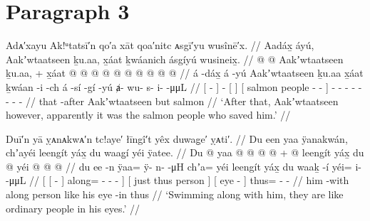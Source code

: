 \clearpage
\section{Paragraph 3}\label{sec:100-para-3}

\ex\label{ex:100-39-salmon-people-rescue}%
%
\begingl
	\glpreamble	Adᴀ′xayu Ak!ᵘtatsī′n qo′a xāt qoa′nitc ᴀsgī′yu wusînē′x. //
	\glpreamble	Aadáx̱ áyú, Aakʼwtaatseen ḵu.aa, x̱áat ḵwáanich ásgíyú wusineix̱. //
	\gla	{}  @ {} {}  @ {} 
		{} Aakʼwtaatseen {} ḵu.aa, +
		{} x̱áat  @ {} @ {} {}  @ {} @ {} @ {}
		 @ {} @ {} @ {} @ {} @ {} //
	\glb	{} á -dáx̱ {} á -yú
		{} Aakʼwtaatseen {} ḵu.aa
		{} x̱áat ḵwáan -i -ch {} á -sí -gí -yú
		ⱥ- wu- s- i-  -μμL //
	\glc	{}[  - {}]  -
		{}[  {}] 
		{}[ salmon people - - {}]  - - -
		- - - -  - //
	\gld	{} that -after {}  {}
		{} Aakʼwtaatseen {} but
		{} salmon  {} {} {}  {} {} {}
		 {} {} {} {} {} //
	\glft	‘After that, Aakʼwtaatseen however, apparently it was the salmon people who saved him.’
		//
\endgl
\xe

\ex\label{ex:100-40-salmon-people-rescue}%
%
\begingl
	\glpreamble	Duī′n yā ỵᴀnᴀkwᴀ′n tc!aye′ łīngî′t yêx duwag̣e′ ỵᴀti′. //
	\glpreamble	Du een yaa ÿanakwán, chʼayéi leengít yáx̱ du waag̱í yéi ÿatee. //
	\gla	{} {} Du  @ {} {} 
			yaa @  @ {} @ {} @ {} {} +
		{}  @ {} leengít yáx̱ {}
		{} du  @ {} {}
		yéi @  @ {} @ {} //
	\glb	{} {} du ee -n {}
			ÿaa= ÿ- n-  -μH {}
		{} chʼa= yéi leengít yáx̱ {}
		{} du waaḵ -í {}
		yéi= i-  -μμL //
	\glc	{}[ {}[   - {}]
			along= - -  - {}]
		{}[ just thus person  {}]
		{}[  eye - {}]
		thus= -  - //
	\gld	{} {} him {} -with {}
			along  {} {} {} {}
		{}  {} person like {}
		{} his eye -in {}
		thus  {} {} //
	\glft	‘Swimming along with him, they are like ordinary people in his eyes.’
		//
\endgl
\xe

